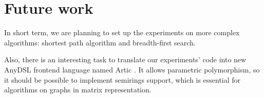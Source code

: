 \documentclass[conference]{IEEEtran}
\begin{document}
\section{Future work}

In short term, we are planning to set up the experiments on more complex algorithms: shortest path algorithm and breadth-first search.

Also, there is an interesting task to translate our experiments' code into new AnyDSL frontend language named Artic \cite{articgit}. It allows parametric polymorphism, so it should be possible to implement semirings support, which is essential for algorithms on graphs in matrix representation.




\end{document}
